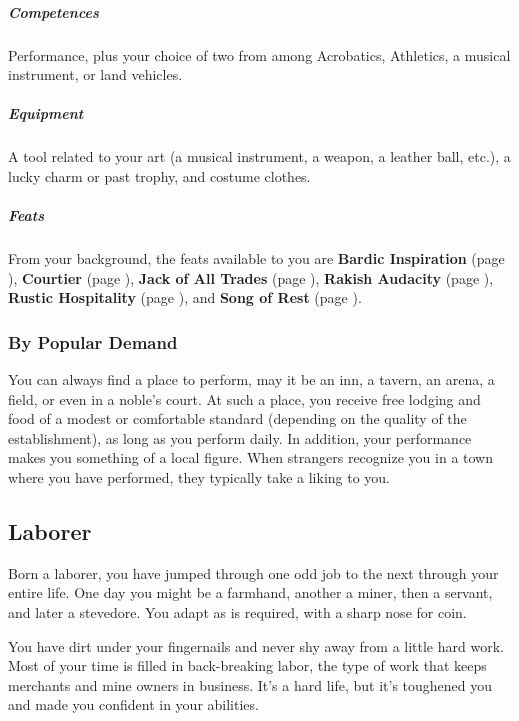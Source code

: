     \subparagraph{Competences} Performance, plus your choice of two from among Acrobatics, Athletics, a musical instrument, or land vehicles.

    \subparagraph{Equipment} A tool related to your art (a musical instrument, a weapon, a leather ball, etc.), a lucky charm or past trophy, and costume clothes.

    \subparagraph{Feats} From your background, the feats available to you are
    \textbf{Bardic Inspiration} (page \pageref{feat::bardicinspiration}),
    \textbf{Courtier} (page \pageref{feat::courtier}),
    \textbf{Jack of All Trades} (page \pageref{feat::jackofalltrades}),
    \textbf{Rakish Audacity} (page \pageref{feat::rakishaudacity}),
    \textbf{Rustic Hospitality} (page \pageref{feat::rustichospitality}), and
    \textbf{Song of Rest} (page \pageref{feat::songofrest}).

    \subsubsection{By Popular Demand} \label{feat::bypopulardemand}
        You can always find a place to perform, may it be an inn, a tavern, an arena, a field, or even in a noble's court.
        At such a place, you receive free lodging and food of a modest or comfortable standard (depending on the quality of the establishment), as long as you perform daily.
        In addition, your performance makes you something of a local figure.
        When strangers recognize you in a town where you have performed, they typically take a liking to you.

\subsection*{Laborer} \label{ssec::laborer}
    Born a laborer, you have jumped through one odd job to the next through your entire life.
    One day you might be a farmhand, another a miner, then a servant, and later a stevedore.
    You adapt as is required, with a sharp nose for coin.

    You have dirt under your fingernails and never shy away from a little hard work.
    Most of your time is filled in back-breaking labor, the type of work that keeps merchants and mine owners in business.%
    It’s a hard life, but it’s toughened you and made you confident in your abilities.

